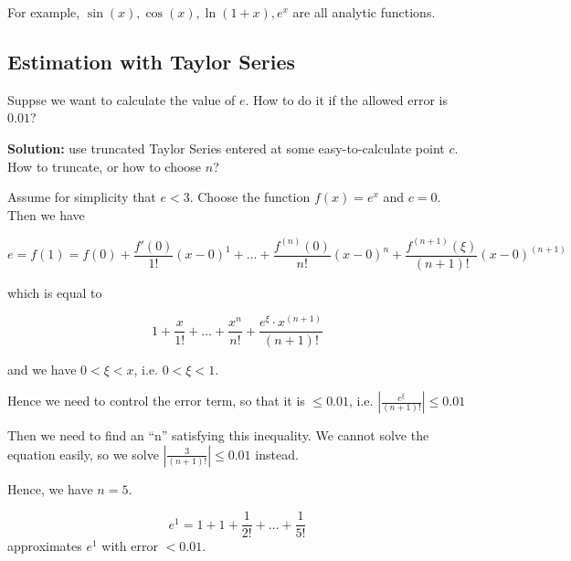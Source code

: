 For example, $\sin(x), \cos(x), \ln(1+x), e^x$ are all analytic functions.

\subsection{Estimation with Taylor Series}

Suppse we want to calculate the value of $e$. How to do it if the allowed error is $0.01$?

\textbf{Solution:} use truncated Taylor Series entered at some easy-to-calculate point $c$. \textrightarrow How to truncate, or how to choose $n$?

Assume for simplicity that $e < 3$. Choose the function $f(x) = e^x$ and $c = 0$. Then we have

$$ e = f(1) = f(0) + \frac{f'(0)}{1!} (x - 0)^1 + \dots + \frac{f^{(n)}(0)}{n!}(x - 0)^n + \frac{f^{(n+1)}(\xi)}{(n+1)!}(x - 0)^{(n+1)} $$

which is equal to

$$ 1 + \frac{x}{1!} + \dots + \frac{x^n}{n!} + \frac{e^\xi \cdot x^{(n + 1)}}{(n + 1)!} $$

and we have $0 < \xi < x$, i.e. $0 < \xi < 1$.

Hence we need to control the error term, so that it is $\leq 0.01$, i.e. $ | \frac{e^\xi}{(n + 1)!} | \leq 0.01 $

Then we need to find an ``n'' satisfying this inequality. We cannot solve the equation easily, so we solve $ | \frac{3}{(n+1)!} | \leq 0.01 $ instead.

Hence, we have $ n = 5 $.

$$ e^1 = 1 + 1 + \frac{1}{2!} + \dots + \frac{1}{5!} $$ approximates $e^1$ with error $< 0.01$.